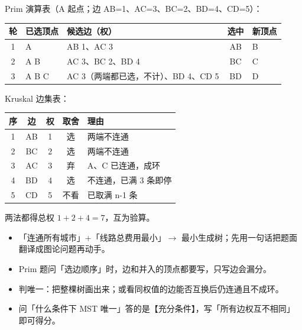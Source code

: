 \documentclass[10pt,a4paper]{ctexart}
\begin{document}
Prim 演算表（A 起点；边 AB=1、AC=3、BC=2、BD=4、CD=5）：

\begin{center}\small
\begin{tabularx}{\linewidth}{@{}cl>{\raggedright\arraybackslash}Xcl@{}}
\toprule
轮 & 已选顶点 & 候选边（权） & 选中 & 新顶点 \\
\midrule
1 & A & AB 1、AC 3 & AB & B \\
2 & A B & AC 3、BC 2、BD 4 & BC & C \\
3 & A B C & AC 3（两端都已选，不计）、BD 4、CD 5 & BD & D \\
\bottomrule
\end{tabularx}
\end{center}

Kruskal 边集表：

\begin{center}\small
\begin{tabularx}{\linewidth}{@{}cccc>{\raggedright\arraybackslash}X@{}}
\toprule
序 & 边 & 权 & 取舍 & 理由 \\
\midrule
1 & AB & 1 & 选 & 两端不连通 \\
2 & BC & 2 & 选 & 两端不连通 \\
3 & AC & 3 & 弃 & A、C 已连通，成环 \\
4 & BD & 4 & 选 & 不连通，已满 3 条即停 \\
5 & CD & 5 & 不看 & 已取满 n-1 条 \\
\bottomrule
\end{tabularx}
\end{center}

两法都得总权 $1+2+4=7$，互为验算。


\begin{itemize}

\item 「连通所有城市」+「线路总费用最小」$\to$ 最小生成树；先用一句话把题面翻译成图论问题再动手。

\item Prim 题问「选边顺序」时，边和并入的顶点都要写，只写边会漏分。

\item 判唯一：把整棵树画出来；或看同权值的边能否互换后仍连通且不成环。

\item 问「什么条件下 MST 唯一」答的是【充分条件】，写「所有边权互不相同」即可得分。

\end{itemize}
\end{document}
